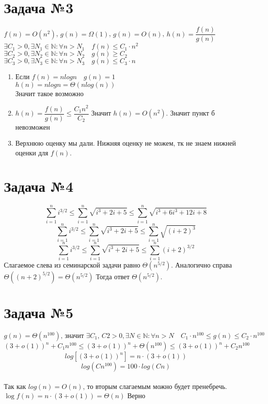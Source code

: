 \documentclass[a4paper,12pt]{article}
\begin{document}
\section*{Задача №3}
  $f(n) = O(n^2)$, $g(n) = \Omega(1)$, $g(n) = O(n)$, $h(n) = \dfrac{f(n)}{g(n)}$ \\
  $\exists C_1 > 0, \exists N_1 \in \mathbb{N}: \forall n > N_1 \quad f(n) \leqslant  C_1 \cdot n^2$ \\
  $\exists C_2 > 0, \exists N_2 \in \mathbb{N}: \forall n > N_2 \quad g(n) \geqslant   C_2$ \\
  $\exists C_3 > 0, \exists N_3 \in \mathbb{N}: \forall n > N_3 \quad g(n) \leqslant  C_3 \cdot n$ \\
  \begin{enumerate}
    \item Если $f(n) = nlogn \quad g(n) = 1$ \\
    $h(n) = nlogn = \Theta(n log(n))$ \\
    Значит такое возможно
    \item $h(n) = \dfrac{f(n)}{g(n)} \leqslant \dfrac{C_1n^2}{C_2}$ Значит $h(n) = O(n^2)$. Значит пункт б невозможен \\
    \item Верхнюю оценку мы дали. Нижняя оценку не можем, тк не знаем нижней оценки для $f(n)$.

  \end{enumerate}

\section*{Задача №4}
  $$\sum ^{n}_{i=1}i^{3/2}\leqslant \sum ^{n}_{i=1}\sqrt{i^{3}+2i+5}\leqslant \sum ^{n}_{i=1}\sqrt{i^{3}+6i^3+12i+8}$$
  $$\sum ^{n}_{i=1}i^{3/2}\leqslant \sum ^{n}_{i=1}\sqrt{i^{3}+2i+5}\leqslant \sum ^{n}_{i=1}\sqrt{(i+2)^3}$$
  $$\sum ^{n}_{i=1}i^{3/2}\leqslant \sum ^{n}_{i=1}\sqrt{i^{3}+2i+5}\leqslant \sum ^{n}_{i=1}(i+2)^{3/2}$$
  Слагаемое слева из семинарской задачи равно $\Theta(n^{5/2})$. Аналогично справа $\Theta((n+2)^{5/2}) = \Theta(n^{5/2})$
  Тогда ответ $\Theta(n^{5/2})$.

\section*{Задача №5}
      $$g(n) = \Theta(n^{100}) \text{, значит } \exists C_1 \text{, } C2 > 0, \exists N \in \mathbb{N}: \forall n > N \quad C_1 \cdot n^{100} \leqslant g(n) \leqslant  C_2 \cdot n^{100}$$
      $$(3 + o(1))^n + C_1 n^{100} \leqslant (3 + o(1))^n + \Theta(n^{100}) \leqslant (3 + o(1))^n + C_2 n^{100}$$
      $$log \left[(3 + o(1))^n\right] = n \cdot \left(3 + o(1)\right)$$
      $$log \left(Cn^{100}\right) = 100 \cdot log(Cn)$$ \\
      Так как $log(n) = O(n)$, то вторым слагаемым можно будет пренебречь.
      $\log f(n) = n \cdot (3 + o(1)) = \Theta(n)$ Верно
    
\end{document}
